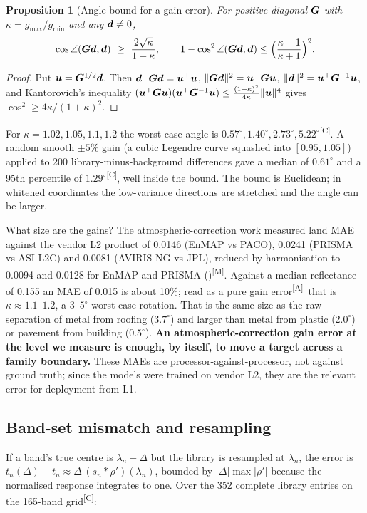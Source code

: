 \documentclass[11pt,a4paper]{article}
\theoremstyle{plain}
\newtheorem{proposition}{Proposition}[section]
\theoremstyle{definition}
\theoremstyle{remark}
\newcommand{\dv}{\B{d}}
\newcommand{\Gm}{\B{G}}
\newcommand{\nrm}[1]{\lVert #1\rVert}
\newcommand{\meas}{\textsuperscript{\textsf{\scriptsize[M]}}}
\newcommand{\comp}{\textsuperscript{\textsf{\scriptsize[C]}}}
\newcommand{\assm}{\textsuperscript{\textsf{\scriptsize[A]}}}
\begin{document}
\begin{proposition}[Angle bound for a gain error]
\label{prop:kant}
For positive diagonal $\Gm$ with $\kappa=g_{\max}/g_{\min}$ and any $\dv\ne0$,
\[
  \cos\angle(\Gm\dv,\dv)\ \ge\ \frac{2\sqrt\kappa}{1+\kappa},\qquad
  1-\cos^2\angle(\Gm\dv,\dv)\le\Big(\frac{\kappa-1}{\kappa+1}\Big)^2 .
\]
\end{proposition}
\begin{proof}
Put $\B u=\Gm^{1/2}\dv$. Then $\dv^\top\Gm\dv=\B u^\top\B u$, $\nrm{\Gm\dv}^2=\B u^\top\Gm\B u$, $\nrm{\dv}^2=\B u^\top\Gm^{-1}\B u$,
and Kantorovich's inequality $(\B u^\top\Gm\B u)(\B u^\top\Gm^{-1}\B u)\le\frac{(1+\kappa)^2}{4\kappa}\nrm{\B u}^4$ gives
$\cos^2\ge4\kappa/(1+\kappa)^2$.
\end{proof}

For $\kappa=1.02,1.05,1.1,1.2$ the worst-case angle is $0.57^\circ,1.40^\circ,2.73^\circ,5.22^\circ$\comp. A random smooth
$\pm5\%$ gain (a cubic Legendre curve squashed into $[0.95,1.05]$) applied to 200 library-minus-background differences gave a
median of $0.61^\circ$ and a 95th percentile of $1.29^\circ$\comp, well inside the bound. The bound is Euclidean; in whitened
coordinates the low-variance directions are stretched and the angle can be larger.

What size are the gains? The atmospheric-correction work measured land MAE against the vendor L2 product of 0.0146 (EnMAP vs
PACO), 0.0241 (PRISMA vs ASI L2C) and 0.0081 (AVIRIS-NG vs JPL), reduced by harmonisation to 0.0094 and 0.0128 for EnMAP and
PRISMA ()\meas. Against a median reflectance of 0.155 an MAE of 0.015 is
about 10\%; read as a pure gain error\assm\ that is $\kappa\approx1.1$--$1.2$, a $3$--$5^\circ$ worst-case rotation. That is the
same size as the raw separation of metal from roofing ($3.7^\circ$) and larger than metal from plastic ($2.0^\circ$) or pavement
from building ($0.5^\circ$). \textbf{An atmospheric-correction gain error at the level we measure is enough, by itself, to move a
target across a family boundary.} These MAEs are processor-against-processor, not against ground truth; since the models were
trained on vendor L2, they are the relevant error for deployment from L1.

\subsection{Band-set mismatch and resampling}

If a band's true centre is $\lambda_n+\Delta$ but the library is resampled at $\lambda_n$, the error is
$t_n(\Delta)-t_n\approx\Delta\,(s_n*\rho')(\lambda_n)$, bounded by $|\Delta|\max|\rho'|$ because the normalised response
integrates to one. Over the 352 complete library entries on the 165-band grid\comp:
\end{document}
